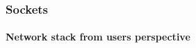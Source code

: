 \begin{frame}		
	
	\frametitle{Sockets}
	\framesubtitle{Network stack from users perspective}
	
	\begin{figure}[H]
	\end{figure}
	
	
\end{frame}